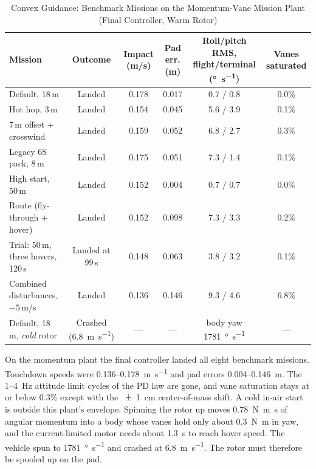 \documentclass[conference]{IEEEtran}
\begin{document}
\begin{table}[htbp]
\caption{Convex Guidance: Benchmark Missions on the Momentum-Vane Mission Plant (Final Controller, Warm Rotor)}
\label{tab:convex_results}
\centering
\footnotesize
\begin{tabular}{lccccc}
\toprule
\textbf{Mission} & \textbf{Outcome} & \textbf{Impact (m/s)} & \textbf{Pad err. (m)} & \textbf{Roll/pitch RMS, flight/terminal (\si{\degree\per\second})} & \textbf{Vanes saturated} \\
\midrule
Default, 18\,m & Landed & 0.178 & 0.017 & 0.7 / 0.8 & 0.0\% \\
Hot hop, 3\,m & Landed & 0.154 & 0.045 & 5.6 / 3.9 & 0.1\% \\
7\,m offset + crosswind & Landed & 0.159 & 0.052 & 6.8 / 2.7 & 0.3\% \\
Legacy 6S pack, 8\,m & Landed & 0.175 & 0.051 & 7.3 / 1.4 & 0.1\% \\
High start, 50\,m & Landed & 0.152 & 0.004 & 0.7 / 0.7 & 0.0\% \\
Route (fly-through + hover) & Landed & 0.152 & 0.098 & 7.3 / 3.3 & 0.2\% \\
Trial: 50\,m, three hovers, 120\,s & Landed at 99\,s & 0.148 & 0.063 & 3.8 / 3.2 & 0.1\% \\
Combined disturbances, $-5$\,m/s & Landed & 0.136 & 0.146 & 9.3 / 4.6 & 6.8\% \\
\midrule
Default, 18\,m, \emph{cold} rotor & Crashed (\SI{6.8}{\metre\per\second}) & --- & --- & body yaw \SI{1781}{\degree\per\second} & --- \\
\bottomrule
\end{tabular}
\end{table}

On the momentum plant the final controller landed all eight benchmark missions. Touchdown speeds were 0.136--\SI{0.178}{\metre\per\second} and pad errors 0.004--\SI{0.146}{\metre}. The 1--\SI{4}{\hertz} attitude limit cycles of the PD law are gone, and vane saturation stays at or below 0.3\% except with the \SI{\pm1}{\centi\metre} center-of-mass shift. A cold in-air start is outside this plant's envelope. Spinning the rotor up moves \SI{0.78}{\newton\metre\second} of angular momentum into a body whose vanes hold only about \SI{0.3}{\newton\metre} in yaw, and the current-limited motor needs about \SI{1.3}{\second} to reach hover speed. The vehicle spun to \SI{1781}{\degree\per\second} and crashed at \SI{6.8}{\metre\per\second}. The rotor must therefore be spooled up on the pad.
\end{document}
